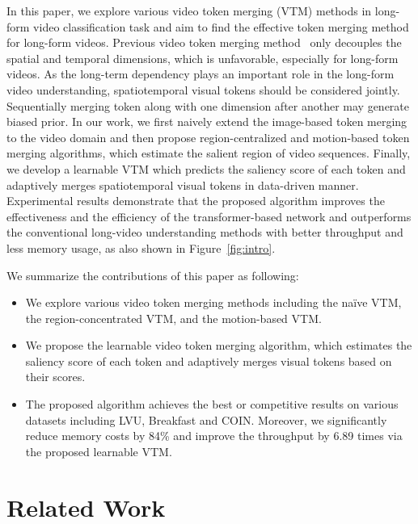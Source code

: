 \documentclass{article}
\begin{document}
In this paper, we explore various video token merging (VTM) methods in long-form video classification task and aim to find the effective token merging method for long-form videos. Previous video token merging method~\citep{li2023vidtome} only decouples the spatial and temporal dimensions, which is unfavorable, especially for long-form videos. As the long-term dependency plays an important role in the long-form video understanding, spatiotemporal visual tokens should be considered jointly. Sequentially merging token along with one dimension after another may generate biased prior. In our work, we first naively extend the image-based token merging~\citep{bolya2022tome} to the video domain and then propose region-centralized and motion-based token merging algorithms, which estimate the salient region of video sequences. Finally, we develop a learnable VTM which predicts the saliency score of each token and adaptively merges spatiotemporal visual tokens in data-driven manner. Experimental results demonstrate that the proposed algorithm improves the effectiveness and the efficiency of the transformer-based network and outperforms the conventional long-video understanding methods with better throughput and less memory usage, as also shown in Figure~\ref{fig:intro}.

We summarize the contributions of this paper as following:
\begin{itemize}[align=parleft,left=10pt..1em, leftmargin=*]
\itemsep0em
    \item We explore various video token merging methods including the na\"ive VTM, the region-concentrated VTM, and the motion-based VTM.
    \item We propose the learnable video token merging algorithm, which estimates the saliency score of each token and adaptively merges visual tokens based on their scores. 
    \item The proposed algorithm achieves the best or competitive results on various datasets including LVU, Breakfast and COIN. Moreover, we significantly reduce memory costs by 84\% and improve the throughput by 6.89 times via the proposed learnable VTM.
\end{itemize}
 

\vspace*{-0.2cm}
\section{Related Work}
\label{sec:rel}
\vspace*{-0.2cm}
\end{document}

